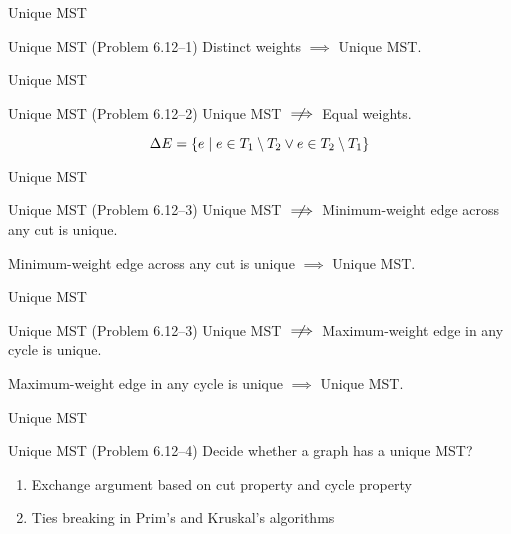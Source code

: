 \begin{frame}{Unique MST}
  \begin{exampleblock}{Unique MST (Problem 6.12--1)}
    Distinct weights $\implies$ Unique MST.
  \end{exampleblock}
\end{frame}
\begin{frame}{Unique MST}
  \begin{exampleblock}{Unique MST (Problem 6.12--2)}
	Unique MST $\centernot\implies$ Equal weights.
  \end{exampleblock}

  \[
	\Delta E = \{e \mid e \in T_1 \setminus T_2 \lor e \in T_2 \setminus T_1\}
  \]

\end{frame}
\begin{frame}{Unique MST}
  \begin{exampleblock}{Unique MST (Problem 6.12--3)}
	Unique MST $\centernot\implies$ Minimum-weight edge across any cut is unique.
  \end{exampleblock}


  \begin{theorem}
    Minimum-weight edge across any cut is unique $\implies$ Unique MST.
  \end{theorem}
\end{frame}
\begin{frame}{Unique MST}
  \begin{exampleblock}{Unique MST (Problem 6.12--3)}
    Unique MST $\centernot\implies$ Maximum-weight edge in any cycle is unique.
  \end{exampleblock}


  \begin{theorem}[Conjecture]
	Maximum-weight edge in any cycle is unique $\implies$ Unique MST.
  \end{theorem}

\end{frame}
\begin{frame}{Unique MST}
  \begin{exampleblock}{Unique MST (Problem 6.12--4)}
	Decide whether a graph has a unique MST?
  \end{exampleblock}

  \vspace{0.60cm}
  \begin{enumerate}
	\item Exchange argument based on cut property and cycle property
	\item Ties breaking in Prim's and Kruskal's algorithms
  \end{enumerate}
\end{frame}

